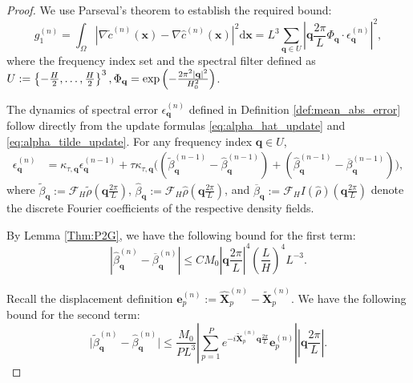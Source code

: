 \documentclass[review,onefignum,onetabnum]{siamart250211}
\begin{document}
\begin{proof}
We use Parseval's theorem to establish the required bound:
\begin{equation}
    g_1^{(n)}=\int_\Omega \left| \nabla \tilde{c}^{(n)}(\mathbf{x}) - \nabla \hat{c}^{(n)}(\mathbf{x}) \right|^2 \mathrm{d}\mathbf{x} = L^3 \sum_{\mathbf{q} \in U} \left| \mathbf{q} \frac{2\pi}{L} \Phi_{\mathbf q} \cdot \epsilon^{(n)}_{\mathbf{q}} \right|^2,
  \label{eq:energy_low_freq}
\end{equation}
where the frequency index set and the spectral filter defined as \(U := \left\{-\frac{H}{2}, \ldots, \frac{H}{2}\right\}^3,\\\Phi_{\mathbf q}=\exp\left(-\frac{2\pi ^2|\mathbf q|^2}{H_0^2}\right)\).

The dynamics of spectral error $\epsilon_{\mathbf{q}}^{(n)}$ defined in Definition \ref{def:mean_abs_error} follow directly from the update formulas \eqref{eq:alpha_hat_update} and \eqref{eq:alpha_tilde_update}. For any frequency index $\mathbf{q} \in U$, 
\begin{equation}
\label{eq:e_decomp}
\begin{aligned}
\epsilon^{(n)}_{\mathbf{q}} 
&= \kappa_{\tau,\mathbf q} \epsilon^{(n-1)}_{\mathbf{q}} + \tau \kappa_{\tau,\mathbf q} 
   \biggl( (\tilde{\beta}^{(n-1)}_{\mathbf{q}} - \hat{\beta}^{(n-1)}_{\mathbf{q}})  + ( \hat{\beta}^{(n-1)}_{\mathbf{q}} - \overline{\beta}^{(n-1)}_{\mathbf{q}} )\biggr),
\end{aligned}
\end{equation}
where $\tilde{\beta}_{\mathbf{q}} := \mathcal{F}_H\tilde{\rho}(\mathbf{q}\frac{2\pi}{L})$,  $\hat{\beta}_{\mathbf{q}} := \mathcal{F}_H\hat{\rho}(\mathbf{q}\frac{2\pi}{L})$, and $\overline{\beta}_{\mathbf{q}} := \mathcal{F}_H I\left( \hat{\rho}\right)(\mathbf{q}\frac{2\pi}{L}) $ denote the discrete Fourier coefficients of the respective density fields.

By Lemma \ref{Thm:P2G}, we have the following bound for the first term:
\begin{equation}
|\hat{\beta}^{(n)}_{\mathbf{q}} - \overline{\beta}^{(n)}_{\mathbf{q}}| \leq C M_0 \left|\mathbf{q} \frac{2\pi}{L}\right|^4 \left( \frac{L}{H} \right)^4 L^{-3}.
\end{equation}

Recall the displacement definition \( \mathbf{e}_p^{(n)} := \widehat{\mathbf{X}}_p^{(n)} - \widetilde{\mathbf{X}}_p^{(n)} \). We have the following bound for the second term: 
\begin{equation}
\bigl| \tilde{\beta}_{\mathbf{q}}^{(n)} - \hat{\beta}_{\mathbf{q}}^{(n)} \bigr| 
\leq \frac{M_0}{P L^3}\left| \sum_{p=1}^P e^{-i\widetilde{\mathbf{X}}_p^{(n)}\mathbf{q}\frac{2\pi}{L}} \mathbf{e}_p^{(n)}\right| \left|\mathbf{q}\frac{2\pi}{L}\right|.
\end{equation}


\end{proof}
\end{document}
